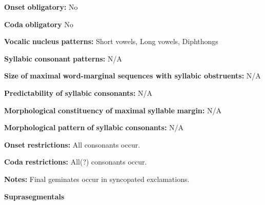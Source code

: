 \documentclass[output=paper]{langsci/langscibook}
\begin{document}
\begin{styleBody}
\textbf{Onset} \textbf{obligatory:} No
\end{styleBody}

\begin{styleBody}
\textbf{Coda} \textbf{obligatory} No
\end{styleBody}

\begin{styleBody}
\textbf{Vocalic} \textbf{nucleus} \textbf{patterns:} Short vowels, Long vowels, Diphthongs
\end{styleBody}

\begin{styleBody}
\textbf{Syllabic} \textbf{consonant} \textbf{patterns:} N/A
\end{styleBody}

\begin{styleBody}
\textbf{Size} \textbf{of} \textbf{maximal} \textbf{word{}-marginal sequences with syllabic obstruents:} N/A
\end{styleBody}

\begin{styleBody}
\textbf{Predictability} \textbf{of} \textbf{syllabic} \textbf{consonants:} N/A
\end{styleBody}

\begin{styleBody}
\textbf{Morphological} \textbf{constituency} \textbf{of} \textbf{maximal} \textbf{syllable} \textbf{margin:} N/A
\end{styleBody}

\begin{styleBody}
\textbf{Morphological} \textbf{pattern} \textbf{of} \textbf{syllabic} \textbf{consonants:} N/A
\end{styleBody}

\begin{styleBody}
\textbf{Onset} \textbf{restrictions:} All consonants occur.
\end{styleBody}

\begin{styleBody}
\textbf{Coda} \textbf{restrictions:} All(?) consonants occur.
\end{styleBody}

\begin{styleBody}
\textbf{Notes:} Final geminates occur in syncopated exclamations.
\end{styleBody}

\begin{styleBody}
\textbf{Suprasegmentals}
\end{styleBody}
\end{document}
